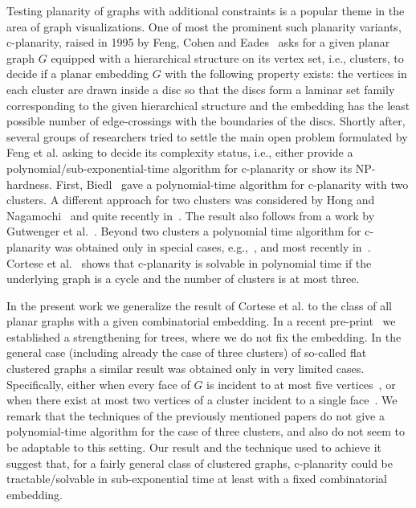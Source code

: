\documentclass{llncs}
\def\cNP{\hbox{\rm \sffamily NP}}
\begin{document}
Testing planarity of graphs with additional constraints is a popular theme in
the area of graph visualizations.
One of most the prominent such planarity variants, c-planarity, raised in 1995 by Feng, Cohen and Eades~\cite{FCEa95,FCEb95} 
asks for a given planar graph $G$ equipped with a hierarchical structure on its vertex 
set, i.e., clusters, to decide if a planar embedding $G$ with the following property exists:
the vertices in each cluster are drawn inside a disc so that the discs
form a laminar set family corresponding to the given hierarchical structure
and the embedding has the least possible number of edge-crossings with the boundaries of the discs.
Shortly after, several groups of researchers tried to settle
the main open problem formulated by Feng et al. asking to decide its complexity
status, i.e., either provide
a polynomial/sub-exponential-time  algorithm for c-planarity or show its \cNP-hardness.
First, Biedl~\cite{B98} gave
 a polynomial-time algorithm for c-planarity with two clusters. A different approach
for two clusters was considered by Hong and Nagamochi~\cite{HN16}
and quite recently in~\cite{FKMP15}.
 The result also follows from a work by Gutwenger et al.~\cite{GJL+02}.
Beyond two clusters a polynomial time algorithm for c-planarity was obtained only in special cases,
e.g.,~\cite{BFPP08,GLS05,GJL+02,JJK+09,JKK+09}, and most recently in~\cite{BR14+,CBFK14+}. Cortese et al.~\cite{CDPP05} shows that c-planarity is solvable in polynomial
time if the underlying  graph is a cycle and the number of clusters
is at most three.

 In the present work we generalize the result of Cortese et al. to the class of all planar graphs
with a given combinatorial embedding. In a recent pre-print~\cite{F14+} we established 
a strengthening for trees, where we do not fix the embedding.
In the general case (including already the case of three clusters) of so-called flat clustered graphs a similar result was obtained
only in very limited cases. Specifically, either when every face of $G$ is incident
to at most five vertices~\cite{BF07,FKMP15}, or when there exist at most two vertices of a cluster incident to a single face~\cite{CBFK14+}.
We remark that the techniques of the previously mentioned papers do not give
a polynomial-time algorithm for the case of three clusters, and also do not seem to be adaptable
to this setting. Our result and the technique used to achieve it suggest that, for a fairly general class of clustered graphs, c-planarity could be tractable/solvable in  sub-exponential time at least with a fixed combinatorial embedding. 
\end{document}
